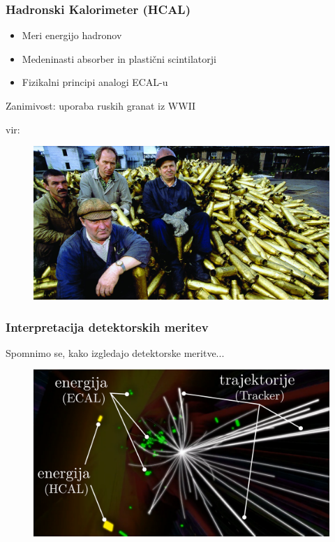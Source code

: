 \documentclass[14pt, t]{beamer}
\begin{document}
\begin{frame}
    \frametitle{Hadronski Kalorimeter (HCAL)}
    \begin{itemize}
    
        \item Meri energijo hadronov

        \item Medeninasti absorber in plastični scintilatorji

        \item Fizikalni principi analogi ECAL-u

    \end{itemize}

    \pause
    Zanimivost: uporaba ruskih granat iz WWII

    \hfill \tiny{vir: \cite{hcal-grenades}} \quad
    \vspace{-2.5mm}
    \begin{figure}[htb!]
        \centering
        \includegraphics[width=0.95\linewidth]{raster/png-presentation/hcal-shells}
    \end{figure}
    
\end{frame}

\begin{frame}
    
    \frametitle{Interpretacija detektorskih meritev}
    Spomnimo se, kako izgledajo detektorske meritve...
    \begin{figure}[htb!]
        \centering
        \includegraphics[width=\linewidth]{raster/raster-svg-slo/atlas.pdf}
    \end{figure}
\end{frame}
\end{document}
